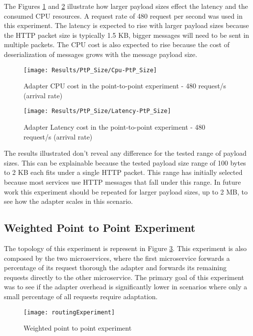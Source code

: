 The Figures  \ref{fig:payloadCpuPtP} and \ref{fig:payloadLatPtP} illustrate how larger payload sizes effect the latency and the consumed CPU resources.
A request rate of 480 request per second was used in this experiment.
The latency is expected to rise with larger payload sizes because the HTTP packet size is typically 1.5 KB, bigger messages will need to be sent in multiple packets.
The CPU cost is also expected to rise because the cost of deserialization of messages grows with the message payload size.

\begin{figure}[htbp]
    \centering
    \centerline{\texttt{[image: Results/PtP\_Size/Cpu-PtP\_Size]}}
    \caption{Adapter CPU cost in the point-to-point experiment - 480 request/s (arrival rate)}
    \label{fig:payloadCpuPtP}
\end{figure}

\begin{figure}[htbp]
    \centering
    \centerline{\texttt{[image: Results/PtP\_Size/Latency-PtP\_Size]}}
    \caption{Adapter Latency cost in the point-to-point experiment - 480 request/s (arrival rate)}
    \label{fig:payloadLatPtP}
\end{figure}

The results illustrated don't reveal any difference for the tested range of payload sizes.
This can be explainable because the tested payload size range of 100 bytes to 2 KB each fits under a single HTTP packet.
This range has initially selected because most services use HTTP messages that fall under this range.
In future work this experiment should be repeated for larger payload sizes, up to 2 MB, to see how the adapter scales in this scenario.

\subsection{Weighted Point to Point Experiment}

The topology of this experiment is represent in Figure \ref{fig:routExp}.
This experiment is also composed by the two microservices, where the first microservice forwards a percentage of its request thorough the adapter
and forwards its remaining requests directly to the other microservice.
The primary goal of this experiment was to see if the adapter overhead is significantly lower in scenarios where only a small percentage of all requests require adaptation.

\begin{figure}[htbp]
    \centering
    \centerline{\texttt{[image: routingExperiment]}}
    \caption{Weighted point to point experiment}
    \label{fig:routExp}
\end{figure}

